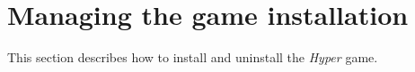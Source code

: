 \section{Managing the game installation}
This section describes how to install and uninstall the \textit{Hyper} game.



